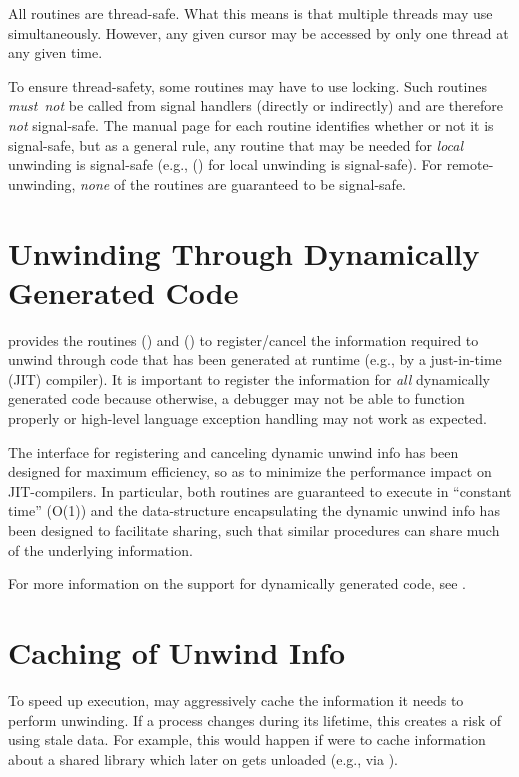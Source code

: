 \documentclass{article}
\begin{document}
All  routines are thread-safe.  What this means is
that multiple threads may use  simultaneously.
However, any given cursor may be accessed by only one thread at
any given time.

To ensure thread-safety, some  routines may have to
use locking.  Such routines \emph{must~not} be called from signal
handlers (directly or indirectly) and are therefore \emph{not}
signal-safe.  The manual page for each  routine
identifies whether or not it is signal-safe, but as a general rule,
any routine that may be needed for \emph{local} unwinding is
signal-safe (e.g., () for local unwinding is
signal-safe).  For remote-unwinding, \emph{none} of the
 routines are guaranteed to be signal-safe.


\section{Unwinding Through Dynamically Generated Code}

 provides the routines () and
() to register/cancel the information required to
unwind through code that has been generated at runtime (e.g., by a
just-in-time (JIT) compiler).  It is important to register the
information for \emph{all} dynamically generated code because
otherwise, a debugger may not be able to function properly or
high-level language exception handling may not work as expected.

The interface for registering and canceling dynamic unwind info has
been designed for maximum efficiency, so as to minimize the
performance impact on JIT-compilers.  In particular, both routines are
guaranteed to execute in ``constant time'' (O(1)) and the
data-structure encapsulating the dynamic unwind info has been designed
to facilitate sharing, such that similar procedures can share much of
the underlying information.

For more information on the  support for dynamically
generated code, see .


\section{Caching of Unwind Info}

To speed up execution,  may aggressively cache the
information it needs to perform unwinding.  If a process changes
during its lifetime, this creates a risk of  using
stale data.  For example, this would happen if  were
to cache information about a shared library which later on gets
unloaded (e.g., via ).
\end{document}
